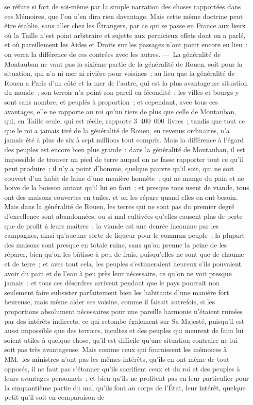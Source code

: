 \documentclass[french,twoside]{book} %
\begin{document}
se réfute si fort de soi-même par la simple narration des choses rapportées dans ces Mémoires, que l’on n’en dira rien davantage. Mais cette même doctrine peut être établie, sans aller chez les Étrangers, par ce qui se passe en France aux lieux où la Taille n’est point arbitraire et sujette aux pernicieux effets dont on a parlé, et où pareillement les Aides et Droits sur les passages n’ont point encore eu lieu : on verra la différence de ces contrées avec les autres. — La généralité de Montauban ne vaut pas la sixième partie de la généralité de Rouen, soit pour la situation, qui n’a ni mer ni rivière pour voisines ; au lieu que la généralité de Rouen a Paris d’un côté et la mer de l’autre, qui est la plus avantageuse situation du monde ; son terroir n’a point son pareil en fécondité ; les villes et bourgs y sont sans nombre, et peuplés à proportion ; et cependant, avec tous ces avantages, elle ne rapporte au roi qu’un tiers de plus que celle de Montauban, qui, en Taille seule, qui est réelle, rapporte 3 400 000 livres ; tandis que tout ce que le roi a jamais tiré de la généralité de Rouen, en revenus ordinaires, n’a jamais été à plus de six à sept millions tout compris. Mais la différence à l’égard des peuples est encore bien plus grande : dans la généralité de Montauban, il est impossible de trouver un pied de terre auquel on ne fasse rapporter tout ce qu’il peut produire ; il n’y a point d’homme, quelque pauvre qu’il soit, qui ne soit couvert d’un habit de laine d’une manière honnête ; qui ne mange du pain et ne boive de la boisson autant qu’il lui en faut ; et presque tous usent de viande, tous ont des maisons couvertes en tuiles, et on les répare quand elles en ont besoin. Mais dans la généralité de Rouen, les terres qui ne sont pas du premier degré d’excellence sont abandonnées, ou si mal cultivées qu’elles causent plus de perte que de profit à leurs maîtres ; la viande est une denrée inconnue par les campagnes, ainsi qu’aucune sorte de liqueur pour le commun peuple ; la plupart des maisons sont presque en totale ruine, sans qu’on prenne la peine de les réparer, bien qu’on les bâtisse à peu de frais, puisqu’elles ne sont que de chaume et de terre ; et avec tout cela, les peuples s’estimeraient heureux s’ils pouvaient avoir du pain et de l’eau à peu près leur nécessaire, ce qu’on ne voit presque jamais ; et tous ces désordres arrivent pendant que le pays pourrait non seulement faire subsister parfaitement bien les habitants d’une manière fort heureuse, mais même aider ses voisins, comme il faisait autrefois, si les proportions absolument nécessaires pour une pareille harmonie n’étaient ruinées par des intérêts indirects, ce qui retombe également sur Sa Majesté, puisqu’il est aussi impossible que des terroirs, incultes et des peuples qui meurent de faim lui soient utiles à quelque chose, qu’il est difficile qu’une situation contraire ne lui soit pas très avantageuse. Mais comme ceux qui fournissent les mémoires à MM. les ministres n’ont pas les mêmes intérêts, qu’ils en ont même de tout opposés, il ne faut pas s’étonner qu’ils sacrifient ceux et du roi et des peuples à leurs avantages personnels ; et bien qu’ils ne profitent pas en leur particulier pour la cinquantième partie du mal qu’ils font au corps de l’État, leur intérêt, quelque petit qu’il soit en comparaison de 
\end{document}
